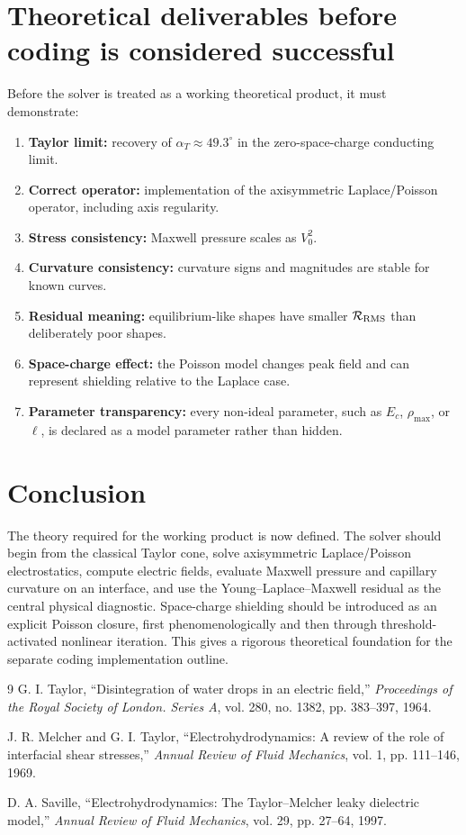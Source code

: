 \documentclass[11pt]{article}
\begin{document}
\section{Theoretical deliverables before coding is considered successful}

Before the solver is treated as a working theoretical product, it must demonstrate:
\begin{enumerate}[label=\arabic*.]
    \item \textbf{Taylor limit:} recovery of \(\alpha_T\approx49.3^\circ\) in the zero-space-charge conducting limit.
    \item \textbf{Correct operator:} implementation of the axisymmetric Laplace/Poisson operator, including axis regularity.
    \item \textbf{Stress consistency:} Maxwell pressure scales as \(V_0^2\).
    \item \textbf{Curvature consistency:} curvature signs and magnitudes are stable for known curves.
    \item \textbf{Residual meaning:} equilibrium-like shapes have smaller \(\mathcal R_{\rm RMS}\) than deliberately poor shapes.
    \item \textbf{Space-charge effect:} the Poisson model changes peak field and can represent shielding relative to the Laplace case.
    \item \textbf{Parameter transparency:} every non-ideal parameter, such as \(E_c\), \(\rho_{\max}\), or \(\ell\), is declared as a model parameter rather than hidden.
\end{enumerate}

\section{Conclusion}

The theory required for the working product is now defined.  The solver should begin from the classical Taylor cone, solve axisymmetric Laplace/Poisson electrostatics, compute electric fields, evaluate Maxwell pressure and capillary curvature on an interface, and use the Young--Laplace--Maxwell residual as the central physical diagnostic.  Space-charge shielding should be introduced as an explicit Poisson closure, first phenomenologically and then through threshold-activated nonlinear iteration.  This gives a rigorous theoretical foundation for the separate coding implementation outline.

\begin{thebibliography}{9}
G. I. Taylor, ``Disintegration of water drops in an electric field,'' \emph{Proceedings of the Royal Society of London. Series A}, vol. 280, no. 1382, pp. 383--397, 1964.

J. R. Melcher and G. I. Taylor, ``Electrohydrodynamics: A review of the role of interfacial shear stresses,'' \emph{Annual Review of Fluid Mechanics}, vol. 1, pp. 111--146, 1969.

D. A. Saville, ``Electrohydrodynamics: The Taylor--Melcher leaky dielectric model,'' \emph{Annual Review of Fluid Mechanics}, vol. 29, pp. 27--64, 1997.
\end{thebibliography}
\end{document}

